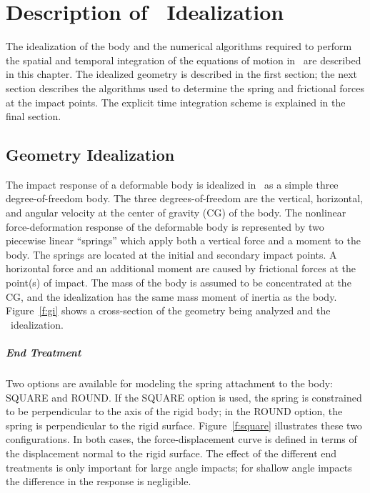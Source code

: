 \chapter{Description of \SLAP\ Idealization}\label{theory}

The idealization of the body and the numerical algorithms required to
perform the spatial and temporal integration of the equations of
motion in \SLAP\ are described in this chapter. The idealized geometry
is described in the first section; the next section describes the
algorithms used to determine the spring and frictional forces at the
impact points.  The explicit time integration scheme is explained in
the final section. 

\section{Geometry Idealization}\label{s:ideal}

The impact response of a deformable body is idealized in \SLAP\ as a
simple three degree-of-freedom body.  The three degrees-of-freedom are
the vertical, horizontal, and angular velocity at the center of
gravity (CG) of the body.  The nonlinear force-deformation response of
the deformable body is represented by two piecewise linear ``springs''
which apply both a vertical force and a moment to the body.  The
springs are located at the initial and secondary impact points. A
horizontal force and an additional moment are caused by frictional
forces at the point(s) of impact.  The mass of the body is assumed to
be concentrated at the CG, and the idealization has the same mass
moment of inertia as the body. Figure~\ref{f:gi} shows a
cross-section of the geometry being analyzed and the \SLAP\
idealization. 

\paragraph*{End Treatment} Two options are available for modeling
the spring attachment to the body: {\sf SQUARE}
and {\sf ROUND}.  If the {\sf SQUARE} option is used, the spring is
constrained to be perpendicular to the axis of the rigid body; in
the {\sf ROUND} option, the spring is perpendicular to the rigid
surface.  Figure~\ref{f:square} illustrates these two configurations.
In both cases, the force-displacement curve is defined in terms of the
displacement normal to the rigid surface.  The effect of the different
end treatments is only important for large angle impacts; for shallow
angle impacts the difference in the response is negligible.

